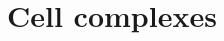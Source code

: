 \documentclass[hott-all.tex]{subfiles}
\begin{document}
\section{Cell complexes}
% 
% 
% 
% 
\end{document}
